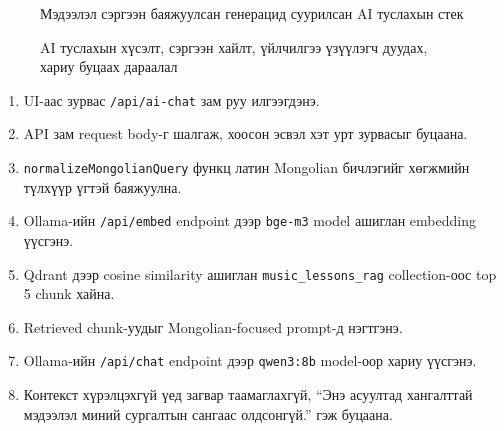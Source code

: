 \begin{figure}[H]
  \centering
  \resizebox{0.72\textwidth}{!}{}
  \caption[AI туслахын стек]{Мэдээлэл сэргээн баяжуулсан генерацид суурилсан AI туслахын стек}
  \label{fig:ch3-ai-stack}
\end{figure}

\begin{figure}[H]
  \centering
  \resizebox{\textwidth}{!}{}
  \caption[AI туслахын дарааллын диаграм]{AI туслахын хүсэлт, сэргээн хайлт, үйлчилгээ үзүүлэгч дуудах, хариу буцаах дараалал}
  \label{fig:ch3-ai-sequence}
\end{figure}

\begin{enumerate}
  \item UI-аас зурвас \texttt{/api/ai-chat} зам руу илгээгдэнэ.
  \item API зам request body-г шалгаж, хоосон эсвэл хэт урт зурвасыг буцаана.
  \item \texttt{normalizeMongolianQuery} функц латин Mongolian бичлэгийг хөгжмийн түлхүүр үгтэй баяжуулна.
  \item Ollama-ийн \texttt{/api/embed} endpoint дээр \texttt{bge-m3} model ашиглан embedding үүсгэнэ.
  \item Qdrant дээр cosine similarity ашиглан \texttt{music\_lessons\_rag} collection-оос top 5 chunk хайна.
  \item Retrieved chunk-уудыг Mongolian-focused prompt-д нэгтгэнэ.
  \item Ollama-ийн \texttt{/api/chat} endpoint дээр \texttt{qwen3:8b} model-оор хариу үүсгэнэ.
  \item Контекст хүрэлцэхгүй үед загвар таамаглахгүй, ``Энэ асуултад хангалттай мэдээлэл миний сургалтын сангаас олдсонгүй.'' гэж буцаана.
\end{enumerate}

